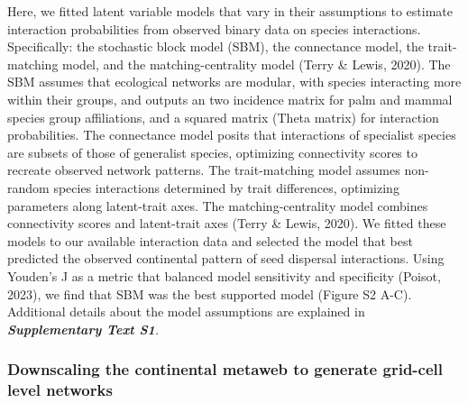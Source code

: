 \documentclass[
]{agujournal2019}
\begin{document}
Here, we fitted latent variable models that vary in their assumptions to
estimate interaction probabilities from observed binary data on species
interactions. Specifically: the stochastic block model (SBM), the
connectance model, the trait-matching model, and the matching-centrality
model (Terry \& Lewis, 2020). The SBM assumes that ecological networks
are modular, with species interacting more within their groups, and
outputs an two incidence matrix for palm and mammal species group
affiliations, and a squared matrix (Theta matrix) for interaction
probabilities. The connectance model posits that interactions of
specialist species are subsets of those of generalist species,
optimizing connectivity scores to recreate observed network patterns.
The trait-matching model assumes non-random species interactions
determined by trait differences, optimizing parameters along
latent-trait axes. The matching-centrality model combines connectivity
scores and latent-trait axes (Terry \& Lewis, 2020). We fitted these
models to our available interaction data and selected the model that
best predicted the observed continental pattern of seed dispersal
interactions. Using Youden's J as a metric that balanced model
sensitivity and specificity (Poisot, 2023), we find that SBM was the
best supported model (Figure S2 A-C). Additional details about the model
assumptions are explained in \emph{\textbf{Supplementary Text S1}.}

\subsubsection{Downscaling the continental metaweb to generate grid-cell
level
networks}\label{downscaling-the-continental-metaweb-to-generate-grid-cell-level-networks}
\end{document}
